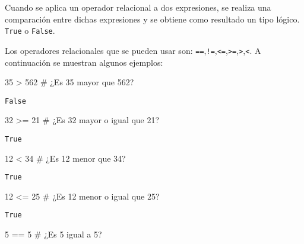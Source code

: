 \documentclass[
  letterpaper,
  DIV=11,
  numbers=noendperiod]{scrreprt}
\newenvironment{Shaded}{\begin{snugshade}}{\end{snugshade}}
\newcommand{\CommentTok}[1]{\textcolor[rgb]{0.37,0.37,0.37}{#1}}
\newcommand{\DecValTok}[1]{\textcolor[rgb]{0.68,0.00,0.00}{#1}}
\newcommand{\OperatorTok}[1]{\textcolor[rgb]{0.37,0.37,0.37}{#1}}
\begin{document}
Cuando se aplica un operador relacional a dos expresiones, se realiza
una comparación entre dichas expresiones y se obtiene como resultado un
tipo lógico. \texttt{True} o \texttt{False}.

Los operadores relacionales que se pueden usar son:
\texttt{==},\texttt{!=},\texttt{\textless{}=},\texttt{\textgreater{}=},\texttt{\textgreater{}},\texttt{\textless{}}.
A continuación se muestran algunos ejemplos:

\begin{Shaded}
\begin{Highlighting}[]
\DecValTok{35} \OperatorTok{\textgreater{}} \DecValTok{562} \CommentTok{\# ¿Es 35 mayor que 562?}
\end{Highlighting}
\end{Shaded}

\begin{verbatim}
False
\end{verbatim}

\begin{Shaded}
\begin{Highlighting}[]
\DecValTok{32} \OperatorTok{\textgreater{}=} \DecValTok{21} \CommentTok{\# ¿Es 32 mayor o igual que 21?}
\end{Highlighting}
\end{Shaded}

\begin{verbatim}
True
\end{verbatim}

\begin{Shaded}
\begin{Highlighting}[]
\DecValTok{12} \OperatorTok{\textless{}} \DecValTok{34} \CommentTok{\# ¿Es 12 menor que 34?}
\end{Highlighting}
\end{Shaded}

\begin{verbatim}
True
\end{verbatim}

\begin{Shaded}
\begin{Highlighting}[]
\DecValTok{12} \OperatorTok{\textless{}=} \DecValTok{25} \CommentTok{\# ¿Es 12 menor o igual que 25?}
\end{Highlighting}
\end{Shaded}

\begin{verbatim}
True
\end{verbatim}

\begin{Shaded}
\begin{Highlighting}[]
\DecValTok{5} \OperatorTok{==} \DecValTok{5} \CommentTok{\# ¿Es 5 igual a 5?}
\end{Highlighting}
\end{Shaded}
\end{document}
